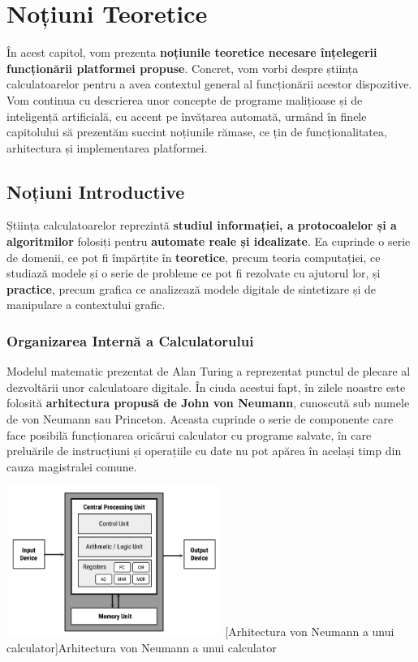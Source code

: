 \documentclass[../../main.tex]{subfiles}
\begin{document}
\chapter{Noțiuni Teoretice}
\label{ch:theory}

În acest capitol, vom prezenta \textbf{noțiunile teoretice necesare înțelegerii func\-ționării platformei propuse}. Concret, vom vorbi despre știința calculatoarelor pentru a avea contextul general al funcționării acestor dispozitive. Vom continua cu descrierea unor concepte de programe malițioase și de inteligență artificială, cu accent pe învățarea automată, urmând în finele capitolului să prezentăm succint noțiunile rămase, ce țin de funcționalitatea, arhitectura și implementarea platformei.

\section{Noțiuni Introductive}
\label{sec:theory_introduction}

Știința calculatoarelor reprezintă \textbf{studiul informației, a protocoalelor și a algoritmilor} folosiți pentru \textbf{automate reale și idealizate}. Ea cuprinde o serie de domenii, ce pot fi împărțite în \textbf{teoretice}, precum teoria computației, ce studiază modele și o serie de probleme ce pot fi rezolvate cu ajutorul lor, și \textbf{practice}, precum grafica ce analizează modele digitale de sintetizare și de manipulare a contextului grafic.

\subsection{Organizarea Internă a Calculatorului}

Modelul matematic prezentat de Alan Turing a reprezentat punctul de plecare al dezvoltării unor calculatoare digitale. În ciuda acestui fapt, în zilele noastre este folosită \textbf{arhitectura propusă de John von Neumann}, cunoscută sub numele de von Neumann sau Princeton. Aceasta cuprinde o serie de componente care face posibilă funcționarea oricărui calculator cu programe salvate, în care preluările de instrucțiuni și operațiile cu date nu pot apărea în același timp din cauza magistralei comune.

\begin{center}
    \includegraphics[width=7cm]{components/images/illustrations/vom_neumann_architecture.jpg}
    \label{fig:vom_neumann_architecture}
    \captionsetup{justification=centering,margin=1cm}
    [Arhitectura von Neumann a unui calculator]{Arhitectura von Neumann a unui calculator\footnotemark}
\end{center}
\vspace{0.3cm}
\end{document}
